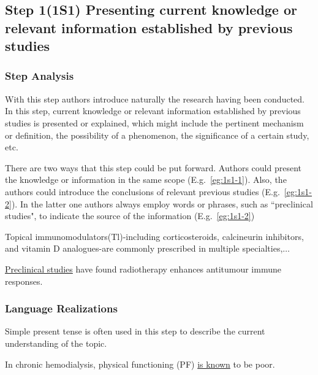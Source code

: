 \documentclass[a4paper]{ctexbook}
\begin{document}
  \subsection{Step 1(1S1) Presenting current knowledge or relevant information established by previous studies}

    \subsubsection{Step Analysis}

    With this step authors introduce naturally the research having been conducted. In this step, current knowledge or relevant information established by previous studies is presented or explained, which might include the pertinent mechanism or definition, the possibility of a phenomenon, the significance of a certain study, etc.
    
    There are two ways that this step could be put forward. Authors could present the knowledge or information in the same scope (E.g.~\ref{eg:1s1-1}). Also, the authors could introduce the conclusions of relevant previous studies (E.g.~\ref{eg:1s1-2}). In the latter one authors always employ words or phrases, such as “preclinical studies", to indicate the source of the information (E.g.~\ref{eg:1s1-2})
    
    \begin{eg}[label={eg:1s1-1}]{}
      Topical immunomodulators(Tl)-including corticosteroids, calcineurin inhibitors, and vitamin D analogues-are commonly prescribed in multiple specialties,$\dots$
    \end{eg}

    \begin{eg}[label={eg:1s1-2}]{}
      \uline{Preclinical studies} have found radiotherapy enhances antitumour immune responses.
    \end{eg}

    \subsubsection{Language Realizations}

    Simple present tense is often used in this step to describe the current understanding of the topic.

    \begin{eg}[label={myautocounter}]{}
      In chronic hemodialysis, physical functioning (PF) \uline{is known} to be poor.
    \end{eg}
\end{document}
